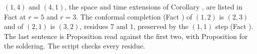 $(1,4)$ and $(4,1)$, the space and time extensions of Corollary , are listed in Fact  at $r = 5$ and $r = 3$. The conformal completion (Fact ) of $(1,2)$ is $(2,3)$ and of $(2,1)$ is $(3,2)$, residues $7$ and $1$, preserved by the $(1,1)$ step (Fact ). The last sentence is Proposition  read against the first two, with Proposition  for the soldering. The script checks every residue.
